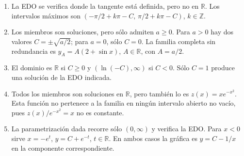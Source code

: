 \begin{enumerate}
\item La EDO se verifica donde la tangente está definida, pero no en $\mathbb{R}$. Los intervalos máximos son $(-\pi/2+k\pi-C,\,\pi/2+k\pi-C)$, $k\in\mathbb{Z}$.
\item Los miembros son soluciones, pero sólo admiten $a\geq0$. Para $a>0$ hay dos valores $C=\pm\sqrt{a/2}$; para $a=0$, sólo $C=0$. La familia completa sin redundancia es $y_A=A(2+\sin x)$, $A\in\mathbb{R}$, con $A=a/2$.
\item El dominio es $\mathbb{R}$ si $C\geq0$ y $(\ln(-C),\infty)$ si $C<0$. Sólo $C=1$ produce una solución de la EDO indicada.
\item Todos los miembros son soluciones en $\mathbb{R}$, pero también lo es $z(x)=xe^{-x^2}$. Esta función no pertenece a la familia en ningún intervalo abierto no vacío, pues $z(x)/e^{-x^2}=x$ no es constante.
\item La parametrización dada recorre sólo $(0,\infty)$ y verifica la EDO. Para $x<0$ sirve $x=-e^t$, $y=C+e^{-t}$, $t\in\mathbb{R}$. En ambos casos la gráfica es $y=C-1/x$ en la componente correspondiente.
\end{enumerate}
